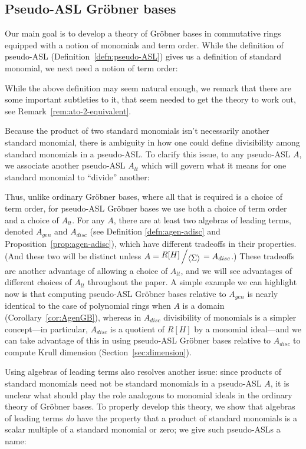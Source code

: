 \documentclass[11pt,reqno]{amsart}
\newcommand{\bigslant}[2]{{\raisebox{.2em}{$#1$}\left/\raisebox{-.2em}{$#2$}\right.}}
\newcommand{\gb}{Gr\"{o}bner }
\theoremstyle{definition}
\numberwithin{equation}{section}
\begin{document}
\subsection{Pseudo-ASL \gb bases}
Our main goal is to develop a theory of \gb bases in commutative rings equipped with a notion of monomials and term order. While the definition of pseudo-ASL (Definition~\ref{defn:pseudo-ASL}) gives us a definition of standard monomial, we next need a notion of term order:



While the above definition may seem natural enough, we remark that there are some important subtleties to it, that seem needed to get the theory to work out, see Remark~\ref{rem:ato-2-equivalent}.

Because the product of two standard monomials isn't necessarily another standard monomial, there is ambiguity in how one could define divisibility among standard monomials in a pseudo-ASL. To clarify this issue, to any pseudo-ASL $A$, we associate another pseudo-ASL $A_{lt}$ which will govern what it means for one standard monomial to ``divide'' another:


Thus, unlike ordinary Gröbner bases, where all that is required is a choice of term order, for pseudo-ASL Gröbner bases we use both a choice of term order and a choice of $A_{lt}$. For any $A$, there are at least two algebras of leading terms, denoted $A_{gen}$ and $A_{disc}$ (see Definition \ref{defn:agen-adisc} and Proposition~\ref{prop:agen-adisc}), which have different tradeoffs in their properties. (And these two will be distinct unless $A = \bigslant{R[H]}{\langle \Sigma \rangle} = A_{disc}$.) These tradeoffs are another advantage of allowing a choice of $A_{lt}$, and we will see advantages of different choices of $A_{lt}$ throughout the paper. A simple example we can highlight now is that computing pseudo-ASL Gröbner bases relative to $A_{gen}$ is nearly identical to the case of polynomial rings when $A$ is a domain (Corollary~\ref{cor:AgenGB}), whereas in $A_{disc}$ divisibility of monomials is a simpler concept---in particular, $A_{disc}$ is a quotient of $R[H]$ by a monomial ideal---and we can take advantage of this in using pseudo-ASL Gröbner bases relative to $A_{disc}$ to compute Krull dimension (Section~\ref{sec:dimension}).

Using algebras of leading terms also resolves another issue: since products of standard monomials need not be standard monomials in a pseudo-ASL $A$, it is unclear what should play the role analogous to monomial ideals in the ordinary theory of Gröbner bases. To properly develop this theory, we show that algebras of leading terms \emph{do} have the property that a product of standard monomials is a scalar multiple of a standard monomial or zero; we give such pseudo-ASLs a name:
\end{document}
